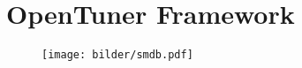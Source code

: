 %     
    
  \section{OpenTuner Framework}
  
  \begin{frame}
    \tableofcontents[currentsection]
  \end{frame}

  
  \begingroup
  \begin{frame}
  
  
  \begin{figure}[ht]
    \centering	      
    \texttt{[image: bilder/smdb.pdf]}
    \label{smdb}
  \end{figure}

  \end{frame}
  \endgroup
    
